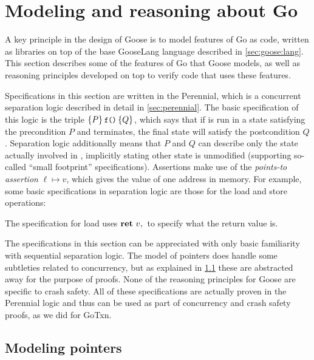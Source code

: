 \section{Modeling and reasoning about Go}%
\label{sec:goose:reasoning}

A key principle in the design of Goose is to model features of Go as code,
written as libraries on top of the base GooseLang language described in
\cref{sec:goose:lang}. This section describes some of the features of Go that
Goose models, as well as reasoning principles developed on top to verify code
that uses these features.

Specifications in this section are written in the Perennial, which is a concurrent
separation logic described in detail in \cref{sec:perennial}. The basic
specification of this logic is the triple
$\hoare{P}{\cc{f()}}{Q}$, which says that if  is run in a state
satisfying the precondition $P$ and terminates, the final state will satisfy the
postcondition $Q$. Separation logic additionally means that $P$ and $Q$ can
describe only the state actually involved in , implicitly stating other
state is unmodified (supporting so-called ``small footprint'' specifications).
Assertions make use of the \emph{points-to assertion} $\ell \mapsto v$, which
gives the value of one address in memory. For example, some basic specifications
in separation logic are those for the load and store operations:
%
\begin{mathpar}

\end{mathpar}

The specification for load uses $\Ret{v}$ to specify what the return value is.

The specifications in this section can be appreciated with only basic
familiarity with sequential separation logic. The model of pointers does handle
some subtleties related to concurrency, but as explained in
\cref{sec:goose:pointers} these are abstracted away for the purpose of proofs.
None of the reasoning principles for Goose are specific to crash safety. All of these
specifications are actually proven in the Perennial logic and thus can be used
as part of concurrency and crash safety proofs, as we did for GoTxn.

\subsection{Modeling pointers}%
\label{sec:goose:pointers}

